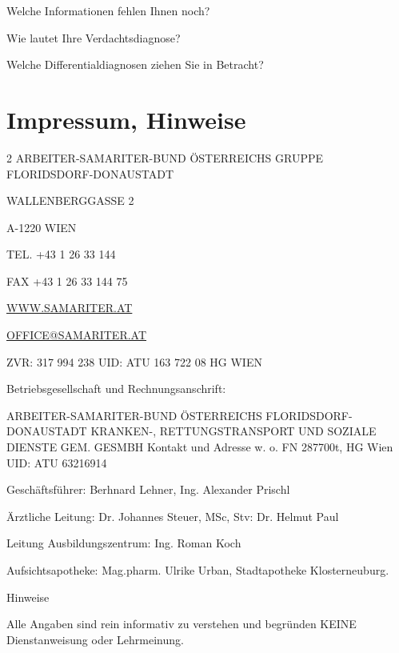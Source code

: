\documentclass{article}
\begin{document}
{\mdseries
Welche Informationen fehlen Ihnen noch?}

{\mdseries
Wie lautet Ihre Verdachtsdiagnose? }

Welche Differentialdiagnosen ziehen Sie in Betracht?



\section{Impressum, Hinweise}
\begin{multicols}{2}
{\mdseries\color{black}
ARBEITER-SAMARITER-BUND \"OSTERREICHS GRUPPE FLORIDSDORF-DONAUSTADT}

{\mdseries
WALLENBERGGASSE 2}

{\mdseries
A-1220 WIEN}

{\mdseries
TEL. +43 1 26 33 144}

{\mdseries
FAX  +43 1 26 33 144 75}

{\mdseries
\href{http://WWW.SAMARITER.AT/}{WWW.SAMARITER.AT}}

{\mdseries
\href{mailto:OFFICE@SAMARITER.AT}{OFFICE@SAMARITER.AT}}

{\mdseries
ZVR: 317 994 238  UID: ATU 163 722 08  HG WIEN}

{\mdseries\color{black}
Betriebsgesellschaft und Rechnungsanschrift:}

ARBEITER-SAMARITER-BUND \"OSTERREICHS FLORIDSDORF-DONAUSTADT KRANKEN-,
RETTUNGSTRANSPORT UND SOZIALE DIENSTE GEM. GESMBH\newline
Kontakt und Adresse w. o.\newline
FN 287700t, HG Wien\newline
UID: ATU 63216914

Gesch\"aftsf\"uhrer: Berhnard Lehner, Ing. Alexander Prischl

\"Arztliche Leitung: Dr. Johannes Steuer, MSc,  Stv: Dr. Helmut Paul

Leitung Ausbildungszentrum: Ing. Roman Koch

Aufsichtsapotheke: Mag.pharm. Ulrike Urban, Stadtapotheke
Klosterneuburg. 

{\color{black}
Hinweise}

Alle Angaben sind rein informativ zu ver\-stehen und begr\"unden KEINE
Dienst\-an\-wei\-sung oder Lehr\-meinung. 


\end{multicols}
\end{document}
